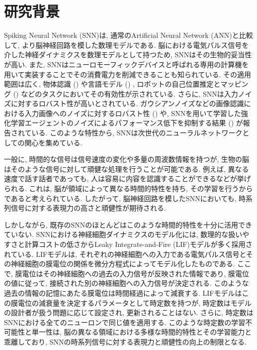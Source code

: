 \section{研究背景}
Spiking Neural Network (SNN)は, 通常のArtificial Neural Network (ANN)と比較して, より脳神経回路を模した数理モデルである.
脳における電気パルス信号を介した神経ダイナミクスを数理モデルとして持つため, SNNはその生物的妥当性が高い.
また, SNNはニューロモーフィックデバイスと呼ばれる専用の計算機を用いて実装することでその消費電力を削減できることも知られている.
その適用範囲は広く, 物体認識 () や言語モデル () , ロボットの自己位置推定とマッピング () などのタスクにおいてその有効性が示されている\cite{yamazaki2022spiking, snnyolo, s23063037, spinnaker,snnslam}.
さらに, SNNは入力ノイズに対するロバスト性が高いとされている.
ガウシアンノイズなどの画像認識における入力画像へのノイズに対するロバスト性 () \cite{zhao2022spiking}や, SNNを用いて学習した強化学習エージェントのノイズによるパフォーマンス低下を抑制する結果 () が報告されている\cite{patel2019improved}.
このような特性から, SNNは次世代のニューラルネットワークとしての関心を集めている\cite{maass1997networks}.

一般に, 時間的な信号は信号速度の変化や多量の周波数情報を持つが, 生物の脳はそのような信号に対して頑健な処理を行うことが可能である.
例えば, 異なる速度で話す話者であっても, 人は容易に内容を認識することができるなどが挙げられる.
これは, 脳が領域によって異なる時間的特性を持ち, その学習を行うからであると考えられている\cite{mattia2002population, deco2019brain}.
したがって, 脳神経回路を模したSNNにおいても, 時系列信号に対する表現力の高さと頑健性が期待される\cite{dhsnn}.

しかしながら, 既存のSNNのほとんどはこのような時間的特性を十分に活用できていない\cite{dhsnn}.
SNNにおける神経細胞ダイナミクスのモデル化には, 数理的な扱いやすさと計算コストの低さからLeaky Integrate-and-Fire (LIF)モデルが多く採用されている.
LIFモデルは, それぞれの神経細胞への入力である電気パルス信号とその神経細胞の膜電位の関係を微分方程式によってモデル化したものである.
ここで, 膜電位はその神経細胞への過去の入力信号が反映された情報であり, 膜電位の値に従って, 接続された別の神経細胞への入力信号が決定される.
このような過去の情報の記憶にあたる膜電位は時間経過によって減衰する.
LIFモデルはこの膜電位の減衰量を決定するパラメータとして時定数を持つが, 時定数はモデルの設計者が扱う問題に応じて設定され, 更新されることはない.
さらに, 時定数はSNNにおける全てのニューロンで同じ値を適用する.
このような時定数の学習不可能性と単一性は, 脳の異なる領域における多様な時間的特性とその学習能力と乖離しており, SNNの時系列信号に対する表現力と頑健性の向上の制限となる.



